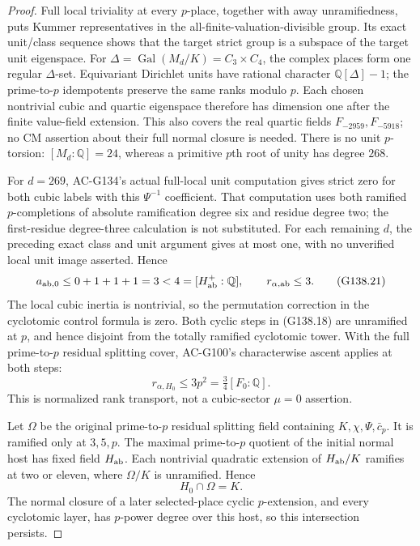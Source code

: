 \begin{proof}
Full local triviality at every \(p\)-place, together with
away unramifiedness, puts Kummer representatives in the
all-finite-valuation-divisible group.  Its exact unit/class
sequence shows that the target strict group is a subspace
of the target unit eigenspace.  For
\(\Delta=\operatorname{Gal}(M_d/K)=C_3\times C_4\), the
complex places form one regular \(\Delta\)-set.  Equivariant
Dirichlet units have rational character
\(\mathbb Q[\Delta]-1\); the prime-to-\(p\) idempotents
preserve the same ranks modulo \(p\).
Each chosen nontrivial cubic and quartic eigenspace therefore
has dimension one after the finite value-field extension.
This also covers the real quartic fields
\(F_{-2959},F_{-5918}\); no CM assertion about their full normal
closure is needed.
There is no unit \(p\)-torsion: \([M_d:\mathbb Q]=24\),
whereas a primitive \(p\)th root of unity has degree \(268\).

For \(d=269\), AC-G134's actual full-local unit computation
gives strict zero for both cubic labels with this
\(\Psi^{-1}\) coefficient.  That computation uses both
ramified \(p\)-completions of absolute ramification degree six
and residue degree two; the first-residue degree-three
calculation is not substituted.
For each remaining \(d\), the preceding exact class and unit
argument gives at most one, with no unverified local unit
image asserted.  Hence
\[
 a_{{\rm ab},0}\le0+1+1+1=3<4=[H_{\rm ab}^+:\mathbb Q],
 \qquad r_{\alpha,{\rm ab}}\le3.
 \tag{G138.21}
\]
The local cubic inertia is nontrivial, so the permutation
correction in the cyclotomic control formula is zero.
Both cyclic steps in (G138.18) are unramified at \(p\),
and hence disjoint from the totally ramified cyclotomic
tower.  With the full prime-to-\(p\) residual splitting
cover, AC-G100's characterwise ascent applies at both steps:
\[
 r_{\alpha,H_0}\le3p^2=\tfrac34[F_0:\mathbb Q].
 \tag{G138.22}
\]
This is normalized rank transport, not a cubic-sector
\(\mu=0\) assertion.

Let \(\Omega\) be the original prime-to-\(p\) residual
splitting field containing \(K,\chi,\Psi,\bar c_p\).
It is ramified only at \(3,5,p\).
The maximal prime-to-\(p\) quotient of the initial normal
host has fixed field \(H_{\rm ab}\).  Each nontrivial
quadratic extension of \(H_{\rm ab}/K\) ramifies at two
or eleven, where \(\Omega/K\) is unramified.  Hence
\[
                         H_0\cap\Omega=K.
 \tag{G138.23}
\]
The normal closure of a later selected-place cyclic
\(p\)-extension, and every cyclotomic layer, has \(p\)-power
degree over this host, so this intersection persists.


\end{proof}
